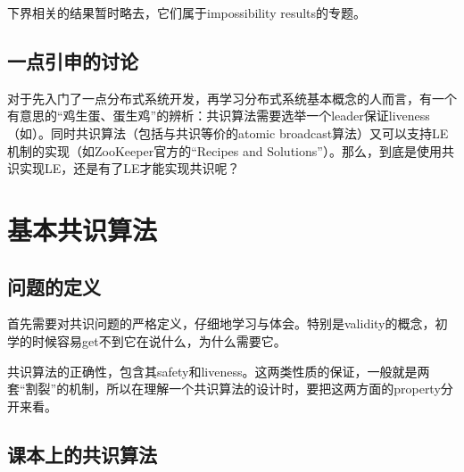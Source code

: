 \documentclass[UTF8]{ctexrep}
\begin{document}
下界相关的结果暂时略去，它们属于impossibility results的专题。


\section{一点引申的讨论}

对于先入门了一点分布式系统开发，再学习分布式系统基本概念的人而言，有一个有意思的“鸡生蛋、蛋生鸡”的辨析：共识算法需要选举一个leader保证liveness（如\cite{Lamport01}）。同时共识算法（包括与共识等价的atomic broadcast算法）又可以支持LE机制的实现（如ZooKeeper官方的“Recipes and Solutions”）。那么，到底是使用共识实现LE，还是有了LE才能实现共识呢？


\chapter{基本共识算法}

\section{问题的定义}

首先需要对共识问题的严格定义，仔细地学习与体会。特别是validity的概念，初学的时候容易get不到它在说什么，为什么需要它。


共识算法的正确性，包含其safety和liveness。这两类性质的保证，一般就是两套“割裂”的机制，所以在理解一个共识算法的设计时，要把这两方面的property分开来看。


\section{课本上的共识算法}
\end{document}
